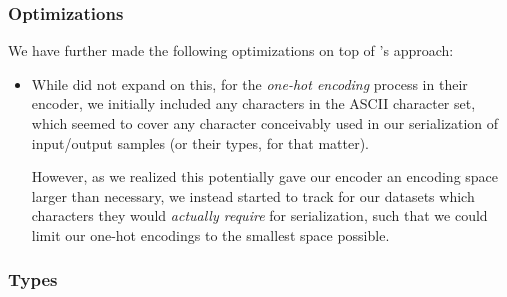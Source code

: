 \documentclass{article}
\begin{document}

\subsubsection{Optimizations}

We have further made the following optimizations on top of \citet{nsps}'s approach:
\begin{itemize}
    \item While \citet{nsps} did not expand on this,
    for the \emph{one-hot encoding} process in their encoder,
    we initially included any characters in the ASCII character set,
    which seemed to cover any character conceivably used in our serialization of input/output samples (or their types, for that matter).

    However, as we realized this potentially gave our encoder an encoding space larger than necessary,
    we instead started to track for our datasets which characters they would \emph{actually require} for serialization,
    such that we could limit our one-hot encodings to the smallest space possible.
\end{itemize}

\subsubsection{Types} \label{sec:typednsps}

\end{document}
